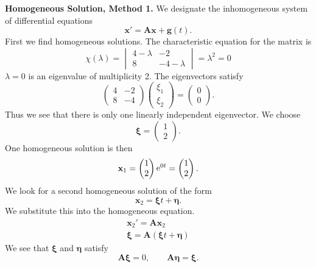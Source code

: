 \begin{Solution}
  \label{solution dxdt=4284x+t3t2}
  \textbf{Homogeneous Solution, Method 1.}
  We designate the inhomogeneous system of differential equations
  \[
  \mathbf{x}' = \mathbf{A} \mathbf{x} + \mathbf{g}(t).
  \]
  First we find homogeneous solutions.  The characteristic equation for 
  the matrix is
  \[
  \chi(\lambda) = 
  \begin{vmatrix}
    4 - \lambda & -2 \\
    8 & -4 - \lambda
  \end{vmatrix} =
  \lambda^2 = 0
  \]
  $\lambda = 0$ is an eigenvalue of multiplicity 2.  The eigenvectors satisfy
  \[
  \begin{pmatrix}
    4 & -2 \\
    8 & -4
  \end{pmatrix}
  \begin{pmatrix}
    \xi_1 \\
    \xi_2
  \end{pmatrix}
  =
  \begin{pmatrix}
    0 \\
    0
  \end{pmatrix}.
  \]
  Thus we see that there is only one linearly independent eigenvector.  We 
  choose
  \[
  \boldsymbol{\xi} = 
  \begin{pmatrix}
    1 \\
    2
  \end{pmatrix}.
  \]
  One homogeneous solution is then
  \[
  \mathbf{x}_1 = 
  \begin{pmatrix}
    1 \\
    2
  \end{pmatrix} \mathop{\mathrm{e}}\nolimits^{0 t} =
  \begin{pmatrix}
    1 \\
    2
  \end{pmatrix}.
  \]
  We look for a second homogeneous solution of the form
  \[
  \mathbf{x}_2 = \boldsymbol{\xi} t + \boldsymbol{\eta}.
  \]
  We substitute this into the homogeneous equation.
  \begin{gather*}
    \mathbf{x}_2' = \mathbf{A} \mathbf{x}_2 \\
    \boldsymbol{\xi} = \mathbf{A} (\boldsymbol{\xi} t + \boldsymbol{\eta})
  \end{gather*}
  We see that $\boldsymbol{\xi}$ and $\boldsymbol{\eta}$ satisfy
  \[
  \mathbf{A} \boldsymbol{\xi} = 0, \qquad \mathbf{A} \boldsymbol{\eta}  = \boldsymbol{\xi}.
\]
\end{Solution}
